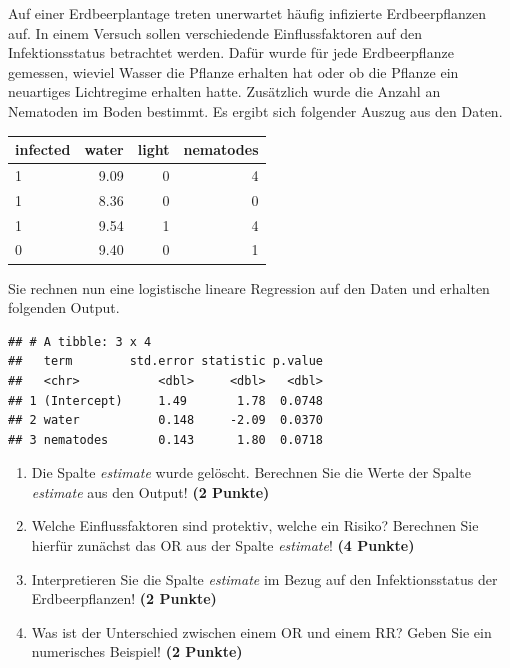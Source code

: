 \documentclass[a4paper, 10pt]{scrartcl}\usepackage[]{graphicx}\usepackage[]{xcolor}
\makeatletter
\newenvironment{kframe}{%
 \def\at@end@of@kframe{}%
 \ifinner\ifhmode%
  \def\at@end@of@kframe{\end{minipage}}%
  \begin{minipage}{\columnwidth}%
 \fi\fi%
 \def\FrameCommand##1{\hskip\@totalleftmargin \hskip-\fboxsep
 \colorbox{shadecolor}{##1}\hskip-\fboxsep
     \hskip-\linewidth \hskip-\@totalleftmargin \hskip\columnwidth}%
 \MakeFramed {\advance\hsize-\width
   \@totalleftmargin\z@ \linewidth\hsize
   \@setminipage}}%
 {\par\unskip\endMakeFramed%
 \at@end@of@kframe}
\newenvironment{knitrout}{}{} %
\makeatother
\begin{document}
Auf einer Erdbeerplantage treten unerwartet h{\"a}ufig infizierte
Erdbeerpflanzen auf. In einem Versuch sollen verschiedende Einflussfaktoren
auf den Infektionsstatus betrachtet werden. Daf{\"u}r wurde f{\"u}r jede
Erdbeerpflanze gemessen, wieviel Wasser die Pflanze erhalten hat oder ob
die Pflanze ein neuartiges Lichtregime erhalten hatte. Zus{\"a}tzlich wurde die
Anzahl an Nematoden im Boden bestimmt. Es ergibt sich folgender Auszug aus
den Daten.

\begin{knitrout}
\color{fgcolor}\begin{table}[!h]
\centering
\begin{tabular}{lrrr}
\toprule
infected & water & light & nematodes\\
\midrule
1 & 9.09 & 0 & 4\\
1 & 8.36 & 0 & 0\\
1 & 9.54 & 1 & 4\\
0 & 9.40 & 0 & 1\\
\bottomrule
\end{tabular}
\end{table}

\end{knitrout}

Sie rechnen nun eine logistische lineare Regression auf den Daten und erhalten
folgenden \Rlogo Output.

\begin{knitrout}
\color{fgcolor}\begin{kframe}
\begin{verbatim}
## # A tibble: 3 x 4
##   term        std.error statistic p.value
##   <chr>           <dbl>     <dbl>   <dbl>
## 1 (Intercept)     1.49       1.78  0.0748
## 2 water           0.148     -2.09  0.0370
## 3 nematodes       0.143      1.80  0.0718
\end{verbatim}
\end{kframe}
\end{knitrout}


\begin{enumerate}
\item Die Spalte \textit{estimate} wurde gel{\"o}scht. Berechnen Sie die Werte
  der Spalte \textit{estimate} aus den \Rlogo Output! \textbf{(2 Punkte)}
\item Welche Einflussfaktoren sind protektiv, welche ein Risiko? Berechnen
  Sie hierf{\"u}r zun{\"a}chst das OR aus der Spalte \textit{estimate}! \textbf{(4 Punkte)}
\item Interpretieren Sie die Spalte \textit{estimate} im Bezug auf den
  Infektionsstatus der Erdbeerpflanzen! \textbf{(2 Punkte)}
\item Was ist der Unterschied zwischen einem OR und einem RR? Geben Sie ein
  numerisches Beispiel! \textbf{(2 Punkte)}
\end{enumerate}
 
\end{document}

